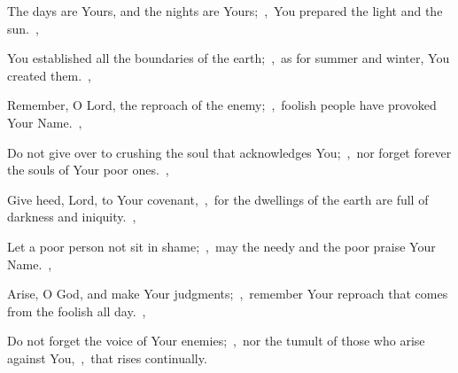 \documentclass[12pt,twoside,a5paper]{article}
\begin{document}
\begin{normalparskip}
  The days are Yours, and the nights are Yours;~\sep\ You prepared the light and the sun.~\sep

  You established all the boundaries of the earth;~\sep\ as for summer and winter, You created them.~\sep

  Remember, O Lord, the reproach of the enemy;~\sep\ foolish people have provoked Your Name.~\sep

  Do not give over to crushing the soul that acknowledges You;~\sep\ nor forget forever the souls of Your poor ones.~\sep

  Give heed, Lord, to Your covenant,~\sep\ for the dwellings of the earth are full of darkness and iniquity.~\sep

  Let a poor person not sit in shame;~\sep\ may the needy and the poor praise Your Name.~\sep

  Arise, O God, and make Your judgments;~\sep\ remember Your reproach that comes from the foolish all day.~\sep

  Do not forget the voice of Your enemies;~\sep\ nor the tumult of those who arise against You,~\sep\ that rises continually.
\end{normalparskip}



\end{document}
